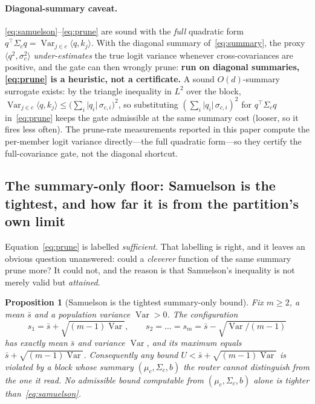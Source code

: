 \documentclass[11pt]{article}
\numberwithin{equation}{section}
\newtheorem{proposition}{Proposition}
\newcommand{\Var}{\operatorname{Var}}
\newcommand{\inner}[2]{\langle #1, #2\rangle}
\begin{document}
\paragraph{Diagonal-summary caveat.} \eqref{eq:samuelson}--\eqref{eq:prune} are sound with the \emph{full}
quadratic form $q^\top\Sigma_c q=\Var_{j\in c}\inner{q}{k_j}$. With the diagonal summary
of~\eqref{eq:summary}, the proxy $\inner{q^2}{\sigma_c^2}$ \emph{under-estimates} the true logit variance
whenever cross-covariances are positive, and the gate can then wrongly prune: \textbf{run on diagonal
summaries, \eqref{eq:prune} is a heuristic, not a certificate.} A sound $O(d)$-summary surrogate exists: by
the triangle inequality in $L^2$ over the block,
$\Var_{j\in c}\inner{q}{k_j}\le\big(\sum_i\lvert q_i\rvert\,\sigma_{c,i}\big)^2$, so substituting
$(\sum_i\lvert q_i\rvert\,\sigma_{c,i})^2$ for $q^\top\Sigma_c q$ in~\eqref{eq:prune} keeps the gate
admissible at the same summary cost (looser, so it fires less often). The prune-rate measurements reported in
this paper compute the per-member logit variance directly---the full quadratic form---so they certify the
full-covariance gate, not the diagonal shortcut.

\subsection{The summary-only floor: Samuelson is the tightest, and how far it is from the
partition's own limit}\label{sec:floor-summary}

Equation~\eqref{eq:prune} is labelled \emph{sufficient}. That labelling is right, and it leaves an obvious
question unanswered: could a \emph{cleverer} function of the same summary prune more? It could not, and the
reason is that Samuelson's inequality is not merely valid but \emph{attained}.

\begin{proposition}[Samuelson is the tightest summary-only bound]\label{prop:tight}
Fix $m\ge 2$, a mean $\bar s$ and a population variance $\Var>0$. The configuration
\begin{equation}\label{eq:witness}
s_1=\bar s+\sqrt{(m-1)\Var},\qquad s_2=\dots=s_m=\bar s-\sqrt{\Var/(m-1)}
\end{equation}
has exactly mean $\bar s$ and variance $\Var$, and its maximum equals $\bar s+\sqrt{(m-1)\Var}$. Consequently
any bound $U<\bar s+\sqrt{(m-1)\Var}$ is violated by a block whose summary $(\mu_c,\Sigma_c,b)$ the router
cannot distinguish from the one it read. No admissible bound computable from $(\mu_c,\Sigma_c,b)$ alone is
tighter than~\eqref{eq:samuelson}.
\end{proposition}
\end{document}
